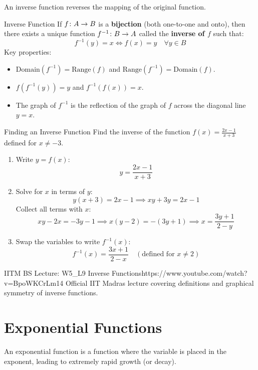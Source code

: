 An inverse function reverses the mapping of the original function.

\begin{definitionbox}{Inverse Function}
If $f \colon A \to B$ is a \textbf{bijection} (both one-to-one and onto), then there exists a unique function $f^{-1} \colon B \to A$ called the \textbf{inverse of $f$} such that:
$$f^{-1}(y) = x \iff f(x) = y \quad \forall y \in B$$
Key properties:
\begin{itemize}
    \item $\text{Domain}(f^{-1}) = \text{Range}(f)$ and $\text{Range}(f^{-1}) = \text{Domain}(f)$.
    \item $f(f^{-1}(y)) = y$ and $f^{-1}(f(x)) = x$.
    \item The graph of $f^{-1}$ is the reflection of the graph of $f$ across the diagonal line $y = x$.
\end{itemize}
\end{definitionbox}

\begin{examplebox}{Finding an Inverse Function}
Find the inverse of the function $f(x) = \frac{2x - 1}{x + 3}$ defined for $x \neq -3$.
\begin{enumerate}
    \item Write $y = f(x)$:
    $$y = \frac{2x - 1}{x + 3}$$
    \item Solve for $x$ in terms of $y$:
    $$y(x + 3) = 2x - 1 \implies xy + 3y = 2x - 1$$
    Collect all terms with $x$:
    $$xy - 2x = -3y - 1 \implies x(y - 2) = -(3y + 1) \implies x = \frac{3y + 1}{2 - y}$$
    \item Swap the variables to write $f^{-1}(x)$:
    $$f^{-1}(x) = \frac{3x + 1}{2 - x} \quad (\text{defined for } x \neq 2)$$
\end{enumerate}
\end{examplebox}

\begin{videocard}{IITM BS Lecture: W5\_L9 Inverse Functions}{https://www.youtube.com/watch?v=BpoWKCrLm14}
Official IIT Madras lecture covering definitions and graphical symmetry of inverse functions.
\end{videocard}

\section{Exponential Functions}

An exponential function is a function where the variable is placed in the exponent, leading to extremely rapid growth (or decay).

